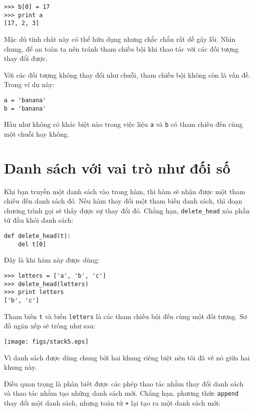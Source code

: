 \documentclass[11pt]{book}
\begin{document}
\beforeverb
\begin{verbatim}
>>> b[0] = 17
>>> print a
[17, 2, 3]
\end{verbatim}
\afterverb
%
Mặc dù tính chất này có thể hữu dụng nhưng chắc chắn rất dễ gây lỗi.
Nhìn chung, để an toàn ta nên tránh tham chiếu bội khi thao tác với
các đối tượng thay đổi được.


Với các đối tượng không thay đổi như chuỗi, tham chiếu bội không còn
là vấn đề. Trong ví dụ này:

\beforeverb
\begin{verbatim}
a = 'banana'
b = 'banana'
\end{verbatim}
\afterverb
%
Hầu như không có khác biệt nào trong việc liệu {\tt a} và {\tt b} 
có tham chiếu đến cùng một chuỗi hay không.


\section{Danh sách với vai trò như đối số}


Khi bạn truyền một danh sách vào trong hàm, thì hàm sẽ nhận được
một tham chiếu đến danh sách đó.
Nếu hàm thay đổi một tham biến danh sách, thì đoạn chương trình gọi
sẽ thấy được sự thay đổi đó. Chẳng hạn, \verb"delete_head" 
xóa phần tử đầu khỏi danh sách:

\beforeverb
\begin{verbatim}
def delete_head(t):
    del t[0]
\end{verbatim}
\afterverb
%
Đây là khi hàm này được dùng:

\beforeverb
\begin{verbatim}
>>> letters = ['a', 'b', 'c']
>>> delete_head(letters)
>>> print letters
['b', 'c']
\end{verbatim}
\afterverb
%
Tham biến {\tt t} và biến {\tt letters} là các tham chiếu bội
đến cùng một đối tượng. Sơ đồ ngăn xếp sẽ trông như sau:


\beforefig
\centerline{\texttt{[image: figs/stack5.eps]}}
\afterfig

Vì danh sách được dùng chung bởi hai khung riêng biệt
nên tôi đã vẽ nó giữa hai khung này.

Điều quan trọng là phân biết được các phép thao tác nhằm
thay đổi danh sách và thao tác nhằm tạo những danh sách mới.
Chẳng hạn, phương thức {\tt append} thay đổi một danh sách,
nhưng toán tử {\tt +} lại tạo ra một danh sách mới:
\end{document}
